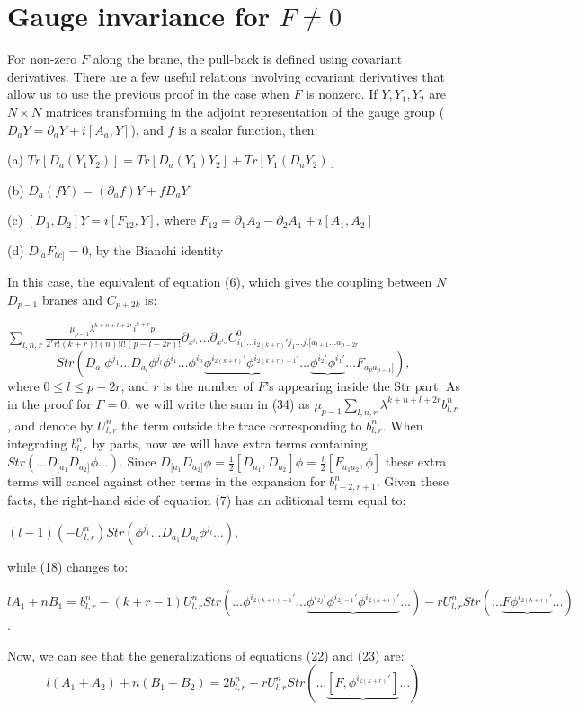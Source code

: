 \documentclass[a4paper,12pt]{article}
\begin{document}
\section{ Gauge invariance for $F\neq 0$}
For non-zero $F$ along the brane, the pull-back is defined using covariant derivatives.  There are a few useful relations involving covariant derivatives that  allow us to use the previous proof in the case when $F$ is nonzero.
If $Y,Y_1,Y_2$ are $N\times N$ matrices transforming in the adjoint representation of the gauge group  ($D_aY=\partial_aY+i[A_a,Y]$), and $f$ is a scalar function, then:

(a) $Tr[D_a(Y_1Y_2)]= Tr[D_a(Y_1) Y_2]+Tr[Y_1(D_aY_2)]$


(b) $D_a(fY)=(\partial_af)Y+fD_aY$

(c) $[D_1,D_2]Y = i [ F_{12},Y]$, where  $F_{12}=\partial_1A_2-\partial_2A_1+i[A_1,A_2]$

(d) $D_{[a}F_{bc]}=0$, by the Bianchi identity

  In this case, the equivalent of equation (6), which gives
the coupling   between $N$ $D_{p-1}$ branes and $C_{p+2k}$ is:

$ 
\sum_{l,n,r} \frac{\mu_{p-1}\lambda^{k+n+l+2r}i^{k+r}p!}{2^rr!(k+r)!(n)!l!(p-l-2r)!}\partial_{x^{i_1}}\ldots \partial_{x^{i_n}} C^0_{i_1'\ldots i_{2(k+r)}'j_1\ldots j_l[a_{l+1}\ldots a_{p-2r}} $
\begin{equation}
 Str \left(D_{a_1}\phi^{j_1}\ldots D_{a_l}\phi^{j_l}\phi^{i_1}\ldots \phi^{i_n}\underbrace{\phi^{i_{2(k+r)}'}\phi^{i_{2(k+r)-1}'}}\dots \underbrace{\phi^{i_2'}\phi^{i_1'}}\ldots F_{a_pa_{p-1}]} \right),
\end{equation}
where  $ 0\le l\le p-2r$, and $r$ is the number of $F$'s appearing inside the Str part. 
As in the proof for $F=0$, we will write the sum in (34) as  $\mu_{p-1}\sum_{l,n,r}\lambda^{k+n+l+2r}b^n_{l,r}$, and denote by $U^n_{l,r}$ the term outside the trace corresponding to $b^n_{l,r}.$
When integrating  $b^n_{l,r}$ by parts,  now we will have extra  terms containing $Str\left(\ldots D_{[a_1}D_{a_2]}\phi\ldots \right)$. Since $D_{[a_1}D_{a_2]}\phi=\frac{1}{2}[D_{a_1}, D_{a_2}]\phi=\frac{i}{2}[F_{a_1a_2},\phi]$  these extra terms will cancel against other terms in the expansion for $b^n_{l-2,r+1}$. Given these facts, the right-hand side of equation (7) has an aditional term equal to:
\begin{center}
$(l-1)(-U^n_{l,r})Str\left(\phi^{j_1}\ldots D_{a_1}D_{a_l}\phi^{j_l}\ldots \right)$,
\end{center}
while (18) changes to: 
\begin{center}
$lA_1+nB_1=b^n_{l,r} -(k+r-1)U^n_{l,r} Str\left(\ldots \phi^{i_{2(k+r)-1}'}\ldots \underbrace{\phi^{i_{2j}'}\phi^{i_{2j-1}'}\phi^{i_{2(k+r)}'}}\ldots \right)-rU^n_{l,r}Str\left(\ldots \underbrace{F\phi^{i_{2(k+r)}'}}\ldots \right)$.
\end{center}
Now, we can see that the generalizations of equations (22) and (23) are:
\begin{equation}
l(A_1+A_2)+n(B_1+B_2)= 2 b^n_{l,r}-r U^n_{l,r}Str\left(\ldots \underbrace{[F,\phi^{i_{2(k+r)}'}]}\ldots \right)
\end{equation}
\end{document}
